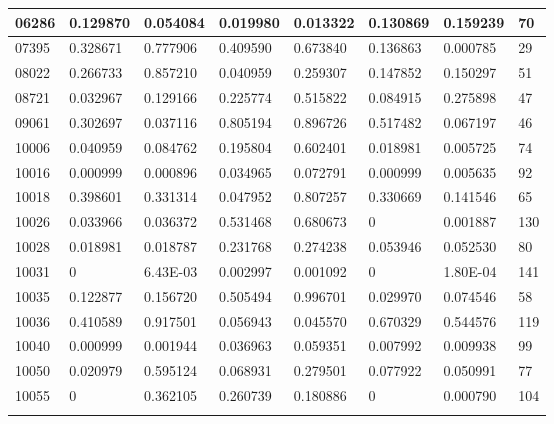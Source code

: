 \begin{table}[H]
{\begin{tabular}{|l|l|l|l|l|l|l|l|}
				06286 & 0.129870 & 0.054084 & 0.019980 & 0.013322 & 0.130869 & 0.159239 & 70 \\ \hline
				07395 & 0.328671 & 0.777906 & 0.409590 & 0.673840 & 0.136863 & 0.000785 & 29 \\ \hline
				08022 & 0.266733 & 0.857210 & 0.040959 & 0.259307 & 0.147852 & 0.150297 & 51 \\ \hline
				08721 & 0.032967 & 0.129166 & 0.225774 & 0.515822 & 0.084915 & 0.275898 & 47 \\ \hline
				09061 & 0.302697 & 0.037116 & 0.805194 & 0.896726 & 0.517482 & 0.067197 & 46 \\ \hline
				10006 & 0.040959 & 0.084762 & 0.195804 & 0.602401 & 0.018981 & 0.005725 & 74 \\ \hline
				10016 & 0.000999 & 0.000896 & 0.034965 & 0.072791 & 0.000999 & 0.005635 & 92 \\ \hline
				10018 & 0.398601 & 0.331314 & 0.047952 & 0.807257 & 0.330669 & 0.141546 & 65 \\ \hline
				10026 & 0.033966 & 0.036372 & 0.531468 & 0.680673 & 0        & 0.001887 & 130 \\ \hline
				10028 & 0.018981 & 0.018787 & 0.231768 & 0.274238 & 0.053946 & 0.052530 & 80 \\ \hline
				10031 & 0        & 6.43E-03 & 0.002997 & 0.001092 & 0        & 1.80E-04 & 141 \\ \hline
				10035 & 0.122877 & 0.156720 & 0.505494 & 0.996701 & 0.029970 & 0.074546 & 58 \\ \hline
				10036 & 0.410589 & 0.917501 & 0.056943 & 0.045570 & 0.670329 & 0.544576 & 119 \\ \hline
				10040 & 0.000999 & 0.001944 & 0.036963 & 0.059351 & 0.007992 & 0.009938 & 99 \\ \hline
				10050 & 0.020979 & 0.595124 & 0.068931 & 0.279501 & 0.077922 & 0.050991 & 77 \\ \hline
				10055 & 0        & 0.362105 & 0.260739 & 0.180886 & 0        & 0.000790 & 104 \\ \hline

\label{tab:nosocsII}
\end{tabular}
}
\end{table}